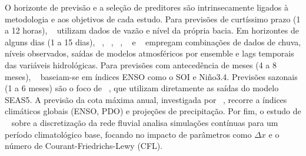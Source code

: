 \documentclass[ 12pt,a4paper ]{article} %
\begin{document}
		O horizonte de previsão e a seleção de preditores são intrinsecamente ligados à metodologia e aos objetivos de cada estudo. Para previsões de curtíssimo prazo (1 a 12 horas), ~\cite{LIU2023} utilizam dados de vazão e nível da própria bacia. Em horizontes de alguns dias (1 a 15 dias), ~\cite{Maciel2022}, ~\cite{alves2022}, ~\cite{Nguyen2015}, ~\cite{Duque2022} e ~\cite{SIQUEIRA2020} empregam combinações de dados de chuva, níveis observados, saídas de modelos atmosféricos por ensemble e lags temporais das variáveis hidrológicas. Para previsões com antecedência de meses (4 a 8 meses), ~\cite{SCHONGART2007} baseiam-se em índices ENSO como o SOI e Niño3.4. Previsões sazonais (1 a 6 meses) são o foco de ~\cite{Gubler2020}, que utilizam diretamente as saídas do modelo SEAS5. A previsão da cota máxima anual, investigada por ~\cite{Chevuturi2021}, recorre a índices climáticos globais (ENSO, PDO) e projeções de precipitação. Por fim, o estudo de ~\cite{fan2021} sobre a discretização da rede fluvial analisa simulações contínuas para um período climatológico base, focando no impacto de parâmetros como \(\Delta x\) e o número de Courant-Friedrichs-Lewy (CFL).
		
		
\end{document}
